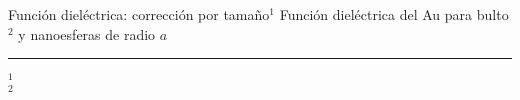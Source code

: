 \begin{frame}{Función dieléctrica: corrección por tamaño$^1$}
{Función dieléctrica del Au para bulto$^2$ y nanoesferas de radio $a$}\small
 \begin{figure} \centering
\def\svgwidth{.7\textwidth}
\end{figure}
	\noindent\rule{.25\textwidth}{0.4pt}
 \begin{spacing}{0}\fontsize{4}{12} \selectfont
	$^1$ \\
	$^2$ 
	\end{spacing}
\end{frame}



